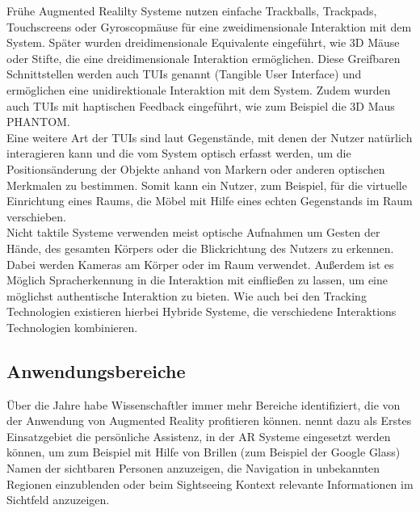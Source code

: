 Frühe Augmented Realilty Systeme nutzen einfache Trackballs, Trackpads, Touchscreens oder Gyroscopmäuse für eine zweidimensionale Interaktion mit dem System. Später wurden dreidimensionale Equivalente eingeführt, wie 3D Mäuse oder Stifte, die eine dreidimensionale Interaktion ermöglichen. Diese Greifbaren Schnittstellen werden auch TUIs genannt (Tangible User Interface) und ermöglichen eine unidirektionale Interaktion mit dem System. Zudem wurden auch TUIs mit haptischen Feedback eingeführt, wie zum Beispiel die 3D Maus PHANTOM. \citep{van2010survey} \\

Eine weitere Art der TUIs sind laut \citet{azuma2001recent} Gegenstände, mit denen der Nutzer natürlich interagieren kann und die vom System optisch erfasst werden, um die Positionsänderung der Objekte anhand von Markern oder anderen optischen Merkmalen zu bestimmen. Somit kann ein Nutzer, zum Beispiel, für die virtuelle Einrichtung eines Raums, die Möbel mit Hilfe eines echten Gegenstands im Raum verschieben. \\

Nicht taktile Systeme verwenden meist optische Aufnahmen um Gesten der Hände, des gesamten Körpers oder die Blickrichtung des Nutzers zu erkennen. Dabei werden Kameras am Körper oder im Raum verwendet. Außerdem ist es Möglich Spracherkennung in die Interaktion mit einfließen zu lassen, um eine möglichst authentische Interaktion zu bieten. Wie auch bei den Tracking Technologien existieren hierbei Hybride Systeme, die verschiedene Interaktions Technologien kombinieren. \citep{van2010survey} \\

\subsection{Anwendungsbereiche}

Über die Jahre habe Wissenschaftler immer mehr Bereiche identifiziert, die von der Anwendung von Augmented Reality profitieren können. \citet{van2010survey} nennt dazu als Erstes Einsatzgebiet die persönliche Assistenz, in der AR Systeme eingesetzt werden können, um zum Beispiel mit Hilfe von Brillen (zum Beispiel der Google Glass) Namen der sichtbaren Personen anzuzeigen, die Navigation in unbekannten Regionen einzublenden oder beim Sightseeing Kontext relevante Informationen im Sichtfeld anzuzeigen. \\

